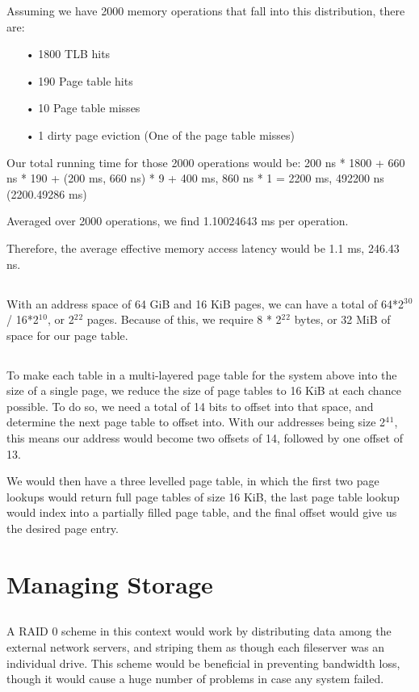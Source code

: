 \documentclass{article}
\begin{document}
Assuming we have 2000 memory operations that fall into this distribution, there are:
\begin{itemize}
\item[•] 1800 TLB hits
\item[•] 190 Page table hits
\item[•] 10 Page table misses
\item[•] 1 dirty page eviction (One of the page table misses)
\end{itemize}

Our total running time for those 2000 operations would be:
200 ns * 1800 + 660 ns * 190 + (200 ms, 660 ns) * 9 + 400 ms, 860 ns * 1 = 2200 ms, 492200 ns (2200.49286 ms)
 
Averaged over 2000 operations, we find 1.10024643 ms per operation.
 
Therefore, the average effective memory access latency would be 1.1 ms, 246.43 ns.

\subsection{}
With an address space of 64 GiB and 16 KiB pages, we can have a total of 64*2$^3$$^0$ / 16*2$^1$$^0$,  or 2$^2$$^2$ pages. Because of this, we require 8 * 2$^2$$^2$ bytes, or 32 MiB of space for our page table.

\subsection{}
To make each table in a multi-layered page table for the system above into the size of a single page, we reduce the size of page tables to 16 KiB at each chance possible. To do so, we need a total of 14 bits to offset into that space, and determine the next page table to offset into. With our addresses being size 2$^4$$^1$, this means our address would become two offsets of 14, followed by one offset of 13.

We would then have a three levelled page table, in which the first two page lookups would return full page tables of size 16 KiB, the last page table lookup would index into a partially filled page table, and the final offset would give us the desired page entry.

\setcounter{section}{5}
\setcounter{subsection}{0}
\section*{Managing Storage}
\subsection{}
A RAID 0 scheme in this context would work by distributing data among the external network servers, and striping them as though each fileserver was an individual drive. This scheme would be beneficial in preventing bandwidth loss, though it would cause a huge number of problems in case any system failed.
\end{document}
